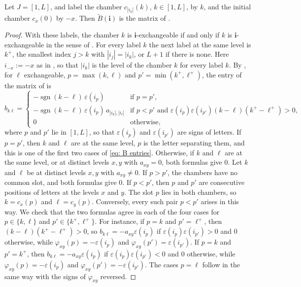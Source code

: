 \documentclass[a4paper]{amsart}
\numberwithin{equation}{section}
\theoremstyle{definition}
\theoremstyle{remark}
\newcommand{\bfi}{\mathbf{i}}
\newcommand{\tB}{\widetilde{B}}
\begin{document}
\begin{proposition}
  \label{prop: BFZ}
  Let $J=[1,L]$, and label the chamber $c_{|i_k|}(k)$, $k\in[1,L]$, by $k$, and the initial chamber $c_x(0)$ by $-x$.
  Then $\tB(\bfi)$ is the matrix of \cite[Definition~2.3]{BFZ05}.
\end{proposition}
\begin{proof}
  With these labels, the chamber $k$ is $\bfi$-exchangeable if and only if $k$ is $\bfi$-exchangeable in the sense of \cite[Section~2.2]{BFZ05}.
  For every label $k$ the next label at the same level is $k^+$, the smallest index $j>k$ with $|i_j|=|i_k|$, or $L+1$ if there is none.
  Here $i_{-x}:=-x$ as in \cite{BFZ05}, so that $|i_k|$ is the level of the chamber $k$ for every label $k$.
  By \cite[Remark~2.4]{BFZ05}, for $\ell$ exchangeable, $p=\max(k,\ell)$ and $p'=\min(k^+,\ell^+)$, the entry of the matrix of \cite{BFZ05} is
  \begin{equation}
    \label{eq: BFZ entries}
    b_{k\ell}=
    \begin{cases}
      -\operatorname{sgn}(k-\ell)\,\varepsilon(i_p) & \text{if } p=p',\\
      -\operatorname{sgn}(k-\ell)\,\varepsilon(i_p)\,a_{|i_k|,|i_\ell|} & \text{if } p<p' \text{ and } \varepsilon(i_p)\varepsilon(i_{p'})(k-\ell)(k^+-\ell^+)>0,\\
      0 & \text{otherwise,}
    \end{cases}
  \end{equation}
  where $p$ and $p'$ lie in $[1,L]$, so that $\varepsilon(i_p)$ and $\varepsilon(i_{p'})$ are signs of letters.
  If $p=p'$, then $k$ and $\ell$ are at the same level, $p$ is the letter separating them, and this is one of the first two cases of \eqref{eq: B entries}.
  Otherwise, if $k$ and $\ell$ are at the same level, or at distinct levels $x,y$ with $a_{xy}=0$, both formulas give $0$.
  Let $k$ and $\ell$ be at distinct levels $x,y$ with $a_{xy}\neq0$.
  If $p>p'$, the chambers have no common slot, and both formulas give $0$.
  If $p<p'$, then $p$ and $p'$ are consecutive positions of letters at the levels $x$ and $y$.
  The slot $p$ lies in both chambers, so $k=c_x(p)$ and $\ell=c_y(p)$.
  Conversely, every such pair $p<p'$ arises in this way.
  We check that the two formulas agree in each of the four cases for $p\in\{k,\ell\}$ and $p'\in\{k^+,\ell^+\}$.
  For instance, if $p=k$ and $p'=\ell^+$, then $(k-\ell)(k^+-\ell^+)>0$, so $b_{k\ell}=-a_{xy}\varepsilon(i_p)$ if $\varepsilon(i_p)\varepsilon(i_{p'})>0$ and $0$ otherwise, while $\varphi_{xy}(p)=-\varepsilon(i_p)$ and $\varphi_{xy}(p')=\varepsilon(i_{p'})$.
  If $p=k$ and $p'=k^+$, then $b_{k\ell}=-a_{xy}\varepsilon(i_p)$ if $\varepsilon(i_p)\varepsilon(i_{p'})<0$ and $0$ otherwise, while $\varphi_{xy}(p)=-\varepsilon(i_p)$ and $\varphi_{xy}(p')=-\varepsilon(i_{p'})$.
  The cases $p=\ell$ follow in the same way with the signs of $\varphi_{xy}$ reversed.
\end{proof}
\end{document}
